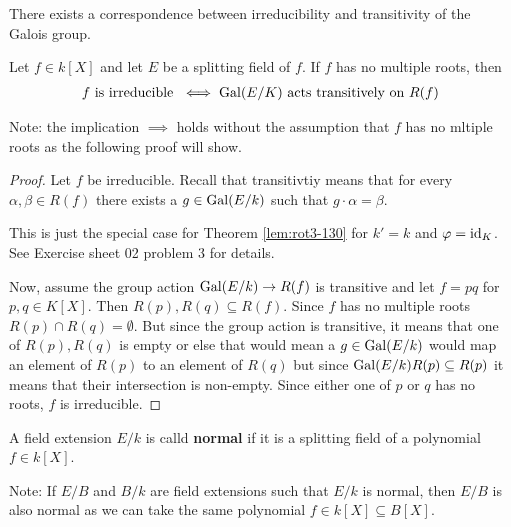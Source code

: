 There exists a correspondence between irreducibility and transitivity of the Galois group.
\begin{cor}[Rotman 3.14]\label{cor:rot3-14}
  Let $f \in k[X]$ and let $E$ be a splitting field of $f$.
  If $f$ has no multiple roots, then
  \begin{align*}
    f \text{ is irreducible } \iff \operatorname{Gal}(E/K) \text{ acts transitively on } R(f)
  \end{align*}
\end{cor}
Note: the implication $\implies$ holds without the assumption that $f$ has no mltiple roots as the following proof will show.
\begin{proof}
  Let $f$ be irreducible. Recall that transitivtiy means that for every $\alpha,\beta \in R(f)$ there exists a $g \in \operatorname{Gal}(E/k)$ such that $g \cdot \alpha = \beta$.

  This is just the special case for Theorem \ref{lem:rot3-130} for $k' = k$ and $\varphi = \operatorname{id}_K$. See Exercise sheet 02 problem 3 for details.

  Now, assume the group action $\operatorname{Gal}(E/k) \to R(f)$ is transitive and let $f= pq$ for $p,q \in K[X]$. Then $R(p), R(q) \subseteq R(f)$.
  Since $f$ has no multiple roots $R(p) \cap R(q) = \emptyset$.
  But since the group action is transitive, it means that one of $R(p),R(q)$ is empty or else that would mean a $g \in \operatorname{Gal}(E/k)$ would map an element of $R(p)$ to an element of $R(q)$ but since $\operatorname{Gal}(E/k) R(p) \subseteq R(p)$ it means that their intersection is non-empty.
  Since either one of $p$ or $q$ has no roots, $f$ is irreducible.
\end{proof}

\begin{dfn}[]
  A field extension $E/k$ is calld \textbf{normal} if it is a splitting field of a polynomial $f \in k[X]$.
\end{dfn}
Note: If $E/B$ and $B/k$ are field extensions such that $E/k$ is normal, then $E/B$ is also normal as we can take the same polynomial $f \in k[X] \subseteq B[X]$.

